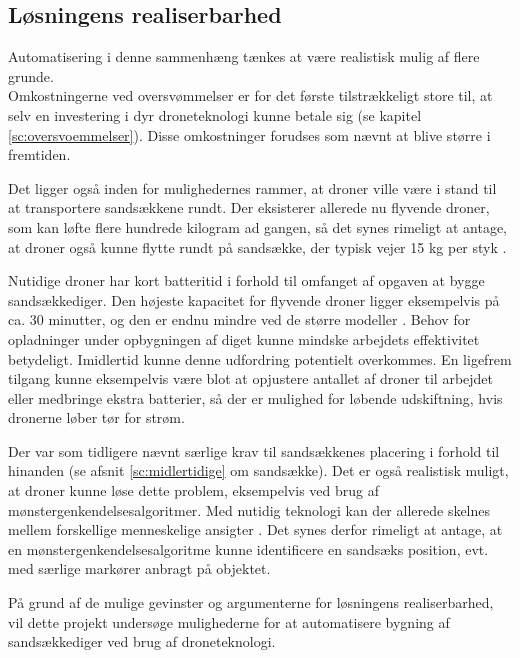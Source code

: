 \subsection{Løsningens realiserbarhed} 
Automatisering i denne sammenhæng tænkes at være realistisk mulig af flere grunde. \\
Omkostningerne ved oversvømmelser er for det første tilstrækkeligt store til, at selv en investering i dyr droneteknologi kunne betale sig (se kapitel \ref{sc:oversvoemmelser}). Disse omkostninger forudses som nævnt at blive større i fremtiden. 
\par
Det ligger også inden for mulighedernes rammer, at droner ville være i stand til at transportere sandsækkene rundt. Der eksisterer allerede nu flyvende droner, som kan løfte flere hundrede kilogram ad gangen, så det synes rimeligt at antage, at droner også kunne flytte rundt på sandsække, der typisk vejer 15 kg per styk \cite{aerones}\cite{usarmysandbag}. 
\par
Nutidige droner har kort batteritid i forhold til omfanget af opgaven at bygge sandsækkediger. Den højeste kapacitet for flyvende droner ligger eksempelvis på ca. 30 minutter, og den er endnu mindre ved de større modeller \cite{flynt2019}. Behov for opladninger under opbygningen af diget kunne mindske arbejdets effektivitet betydeligt. Imidlertid kunne denne udfordring potentielt overkommes. En ligefrem tilgang kunne eksempelvis være blot at opjustere antallet af droner til arbejdet eller medbringe ekstra batterier, så der er mulighed for løbende udskiftning, hvis dronerne løber tør for strøm. 
\par
Der var som tidligere nævnt særlige krav til sandsækkenes placering i forhold til hinanden (se afsnit \ref{sc:midlertidige} om sandsække). Det er også realistisk muligt, at droner kunne løse dette problem, eksempelvis ved brug af mønstergenkendelsesalgoritmer. Med nutidig teknologi kan der allerede skelnes mellem forskellige menneskelige ansigter \cite{patternrec}. Det synes derfor rimeligt at antage, at en mønstergenkendelsesalgoritme kunne identificere en sandsæks position, evt. med særlige markører anbragt på objektet. 
\par
På grund af de mulige gevinster og argumenterne for løsningens realiserbarhed, vil dette projekt undersøge mulighederne for at automatisere bygning af sandsækkediger ved brug af droneteknologi.